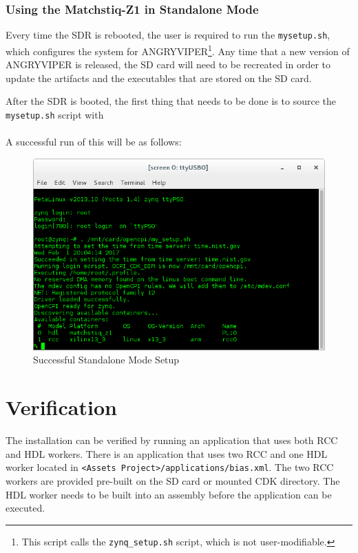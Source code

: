 \subsubsection*{Using the Matchstiq-Z1 in Standalone Mode}
\begin{flushleft}
Every time the SDR is rebooted, the user is required to run the \texttt{mysetup.sh}, which configures the system for ANGRYVIPER\footnote{This script calls the \texttt{zynq\_setup.sh} script, which is not user-modifiable.}. Any time that a new version of ANGRYVIPER is released, the SD card will need to be recreated in order to update the artifacts and the executables that are stored on the SD card.
\end{flushleft}
\begin{flushleft}
After the SDR is booted, the first thing that needs to be done is to source the \texttt{mysetup.sh} script with\\
\leavevmode{\parindent=3em\indent}\\
A successful run of this will be as follows:
\end{flushleft}

\begin{figure}[ht]
	\centerline{\includegraphics[scale=0.5]{Matchstiq_Z1_setup}}
	\caption{Successful Standalone Mode Setup}
	\label{fig:standalonesetup}
\end{figure}

\section{Verification}
The installation can be verified by running an application that uses both RCC and HDL workers.  There is an application that uses two RCC and one HDL worker located in \texttt{<Assets Project>/applications/bias.xml}. The two RCC workers are provided pre-built on the SD card or mounted CDK directory.  The HDL worker needs to be built into an assembly before the application can be executed.
